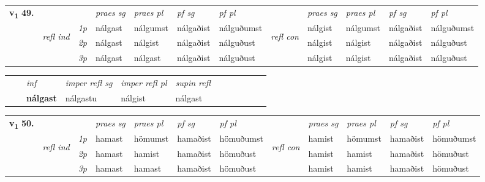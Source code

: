\begin{tabular}{llllllllllll} \toprule
\multirow{4}{*}{{{\textbf{v{\textsubscript{1}}} \Large{\textbf{49.}}}}}  & &   &  \textit{praes sg}  & \textit{praes pl}  &\textit{pf sg} & \textit{pf pl} &  &  \textit{praes sg}  & \textit{praes pl}  & \textit{pf sg} & \textit{pf pl } \\*
	\cmidrule{4-7} \cmidrule{9-12}
 &\multirow{3}{*}{\begin{turn}{90}\textit{refl ind}\end{turn}} & {\textit{1p}} & nálgast & nálgumst    & nálgaðist & nálguðumst & \multirow{3}{*}{\begin{turn}{90}\textit{refl con}\end{turn}}  &nálgist & nálgumst & nálgaðist & nálguðumst\\*
 &&  {\textit{2p}} &  nálgast  & nálgist   & nálgaðist & nálguðust & &nálgist & nálgist & nálgaðist & nálguðust \\*
& &  {\textit{3p}} & nálgast & nálgast   & nálgaðist & nálguðust & & nálgist & nálgist& nálgaðist & nálguðust  \\*
\cmidrule{4-7} \cmidrule{9-12}
\end{tabular}


\begin{tabular}{llllllllllll}
 & & \textit{inf}   & \textit{imper refl sg} & \textit{imper refl pl}   & \textit{supin refl}      \\*
  & & \textbf{nálgast}    & nálgastu & nálgist   & nálgast  \\*
\cmidrule{1-12}
\end{tabular}



\begin{tabular}{llllllllllll} \toprule
\multirow{4}{*}{{{\textbf{v{\textsubscript{1}}} \Large{\textbf{50.}}}}}  & &   &  \textit{praes sg}  & \textit{praes pl}  &\textit{pf sg} & \textit{pf pl} &  &  \textit{praes sg}  & \textit{praes pl}  & \textit{pf sg} & \textit{pf pl } \\*
	\cmidrule{4-7} \cmidrule{9-12}
 &\multirow{3}{*}{\begin{turn}{90}\textit{refl ind}\end{turn}} & {\textit{1p}} & hamast & hömumst    & hamaðist & hömuðumst & \multirow{3}{*}{\begin{turn}{90}\textit{refl con}\end{turn}}  &hamist & hömumst & hamaðist & hömuðumst\\*
 &&  {\textit{2p}} &  hamast  & hamist   & hamaðist & hömuðust & &hamist & hamist & hamaðist & hömuðust \\*
& &  {\textit{3p}} & hamast & hamast   & hamaðist & hömuðust & & hamist & hamist& hamaðist & hömuðust  \\*
\cmidrule{4-7} \cmidrule{9-12}
\end{tabular}


